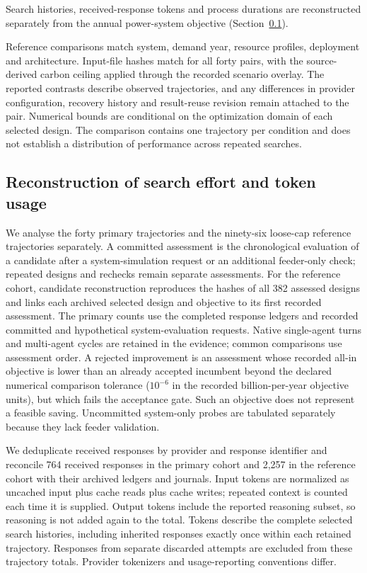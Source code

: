 \documentclass[pdflatex,sn-nature]{sn-jnl}
\begin{document}
Search histories, received-response tokens and process durations are reconstructed separately from the annual power-system objective (Section~\ref{sec:search-methods}).

Reference comparisons match system, demand year, resource profiles, deployment and architecture. Input-file hashes match for all forty pairs, with the source-derived carbon ceiling applied through the recorded scenario overlay. The reported contrasts describe observed trajectories, and any differences in provider configuration, recovery history and result-reuse revision remain attached to the pair. Numerical bounds are conditional on the optimization domain of each selected design. The comparison contains one trajectory per condition and does not establish a distribution of performance across repeated searches.

\subsection{Reconstruction of search effort and token usage}\label{sec:search-methods}

We analyse the forty primary trajectories and the ninety-six loose-cap reference trajectories separately. A committed assessment is the chronological evaluation of a candidate after a system-simulation request or an additional feeder-only check; repeated designs and rechecks remain separate assessments. For the reference cohort, candidate reconstruction reproduces the hashes of all 382 assessed designs and links each archived selected design and objective to its first recorded assessment. The primary counts use the completed response ledgers and recorded committed and hypothetical system-evaluation requests. Native single-agent turns and multi-agent cycles are retained in the evidence; common comparisons use assessment order. A rejected improvement is an assessment whose recorded all-in objective is lower than an already accepted incumbent beyond the declared numerical comparison tolerance ($10^{-6}$ in the recorded billion-per-year objective units), but which fails the acceptance gate. Such an objective does not represent a feasible saving. Uncommitted system-only probes are tabulated separately because they lack feeder validation.

We deduplicate received responses by provider and response identifier and reconcile 764 received responses in the primary cohort and 2,257 in the reference cohort with their archived ledgers and journals. Input tokens are normalized as uncached input plus cache reads plus cache writes; repeated context is counted each time it is supplied. Output tokens include the reported reasoning subset, so reasoning is not added again to the total. Tokens describe the complete selected search histories, including inherited responses exactly once within each retained trajectory. Responses from separate discarded attempts are excluded from these trajectory totals. Provider tokenizers and usage-reporting conventions differ.
\end{document}
